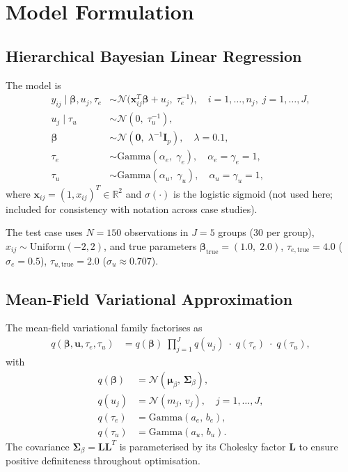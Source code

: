 \documentclass[11pt,a4paper]{article}
\newcommand{\R}{\mathbb{R}}
\newcommand{\N}{\mathcal{N}}
\begin{document}
\section{Model Formulation}

\subsection{Hierarchical Bayesian Linear Regression}

The model is
\begin{align}
  y_{ij} \mid \bm{\beta}, u_j, \tau_e
    &\sim \mathcal{N}\!\bigl(\mathbf{x}_{ij}^T\bm{\beta} + u_j,\; \tau_e^{-1}\bigr),
    \quad i=1,\ldots,n_j,\; j=1,\ldots,J,\\
  u_j \mid \tau_u &\sim \mathcal{N}(0,\; \tau_u^{-1}),\\
  \bm{\beta} &\sim \N(\bm{0},\; \lambda^{-1}\bm{I}_p), \quad \lambda=0.1,\\
  \tau_e &\sim \mathrm{Gamma}(\alpha_e,\; \gamma_e), \quad \alpha_e=\gamma_e=1,\\
  \tau_u &\sim \mathrm{Gamma}(\alpha_u,\; \gamma_u), \quad \alpha_u=\gamma_u=1,
\end{align}
where $\mathbf{x}_{ij} = (1, x_{ij})^T \in \R^2$ and $\sigma(\cdot)$ is the logistic sigmoid
(not used here; included for consistency with notation across case studies).

The test case uses $N=150$ observations in $J=5$ groups (30 per group),
$x_{ij} \sim \mathrm{Uniform}(-2,2)$, and true parameters
$\bm{\beta}_{\mathrm{true}} = (1.0,\; 2.0)$,
$\tau_{e,\mathrm{true}}=4.0$ ($\sigma_e = 0.5$),
$\tau_{u,\mathrm{true}}=2.0$ ($\sigma_u \approx 0.707$).

\subsection{Mean-Field Variational Approximation}

The mean-field variational family factorises as
\begin{align}
  q(\bm{\beta},\mathbf{u},\tau_e,\tau_u)
  &= q(\bm{\beta})\;\prod_{j=1}^{J} q(u_j)\;\cdot\; q(\tau_e)\;\cdot\; q(\tau_u),
\end{align}
with
\begin{align}
  q(\bm{\beta}) &= \N(\bm{\mu}_\beta,\,\bm{\Sigma}_\beta),\\
  q(u_j) &= \mathcal{N}(m_j,\, v_j), \quad j=1,\ldots,J,\\
  q(\tau_e) &= \mathrm{Gamma}(a_e,\, b_e),\\
  q(\tau_u) &= \mathrm{Gamma}(a_u,\, b_u).
\end{align}
The covariance $\bm{\Sigma}_\beta = \bm{L}\bm{L}^T$ is parameterised by its Cholesky
factor $\bm{L}$ to ensure positive definiteness throughout optimisation.
\end{document}
